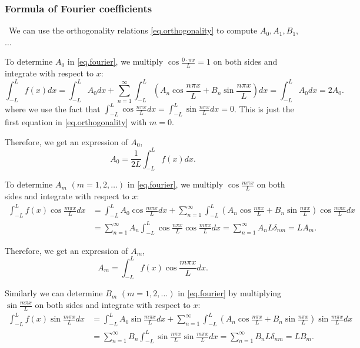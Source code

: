 \subsubsection{Formula of Fourier coefficients}

\quad\, We can use the orthogonality relations \eqref{eq.orthogonality} to compute $A_0, A_1, B_1$, $\dots$

To determine $A_0$ in \eqref{eq.fourier}, we multiply $\cos \frac{0 \cdot \pi x}{L}=1$ on both sides and integrate with respect to $x$:
$$
\int_{-L}^L f(x) d x=\int_{-L}^L A_0 d x+\sum_{n=1}^{\infty} \int_{-L}^L\left(A_n \cos \frac{n \pi x}{L}+B_n \sin \frac{n \pi x}{L}\right) d x=\int_{-L}^L A_0 d x=2 A_0.
$$
where we use the fact that $\int_{-L}^L \cos \frac{n \pi x}{L} dx = \int_{-L}^L \sin \frac{n \pi x}{L} dx = 0$. This is just the first equation in \eqref{eq.orthogonality} with $m = 0$. 

Therefore, we get an expression of $A_0$,
$$
A_0=\frac{1}{2 L} \int_{-L}^L f(x) d x.
$$

To determine $A_m$ $(m=1,2, \ldots)$ in \eqref{eq.fourier}, we multiply $\cos \frac{m \pi x}{L}$ on both sides and integrate with respect to $x$:
$$
\begin{aligned}
\int_{-L}^L f(x) \cos \frac{m \pi x}{L} d x & =\int_{-L}^L A_0 \cos \frac{m \pi x}{L} d x+\sum_{n=1}^{\infty} \int_{-L}^L\left(A_n \cos \frac{n \pi x}{L}+B_n \sin \frac{n \pi x}{L}\right) \cos \frac{m \pi x}{L} d x \\
& =\sum_{n=1}^{\infty} A_n \int_{-L}^L \cos \frac{n \pi x}{L} \cos \frac{m \pi x}{L} d x=\sum_{n=1}^{\infty} A_n L \delta_{n m}=L A_m .
\end{aligned}
$$

Therefore, we get an expression of $A_m$,
$$
A_m = \int_{-L}^L f(x) \cos \frac{m \pi x}{L} d x.
$$

Similarly we can determine $B_m$ $(m=1,2, \ldots)$ in \eqref{eq.fourier} by multiplying $\sin \frac{m \pi x}{L}$ on both sides and integrate with respect to $x$:
$$
\begin{aligned}
\int_{-L}^L f(x) \sin \frac{m \pi x}{L} d x & =\int_{-L}^L A_0 \sin \frac{m \pi x}{L} d x+\sum_{n=1}^{\infty} \int_{-L}^L\left(A_n \cos \frac{n \pi x}{L}+B_n \sin \frac{n \pi x}{L}\right) \sin \frac{m \pi x}{L} d x \\
& =\sum_{n=1}^{\infty} B_n \int_{-L}^L \sin \frac{n \pi x}{L} \sin \frac{m \pi x}{L} d x=\sum_{n=1}^{\infty} B_n L \delta_{n m}=L B_m .
\end{aligned}
$$

